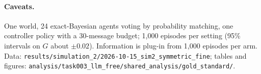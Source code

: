 \documentclass[10pt,a4paper]{article}
\begin{document}
\paragraph{Caveats.} One world, 24 exact-Bayesian agents voting by probability matching, one controller policy
with a 30-message budget; 1{,}000 episodes per setting (95\% intervals on $G$ about $\pm0.02$). Information is
plug-in from 1{,}000 episodes per arm. Data:
\texttt{results/simulation\_2/2026-10-15\_sim2\_symmetric\_fine}; tables and figures:
\texttt{analysis/task003\_llm\_free/shared\_analysis/gold\_standard/}.
\end{document}
